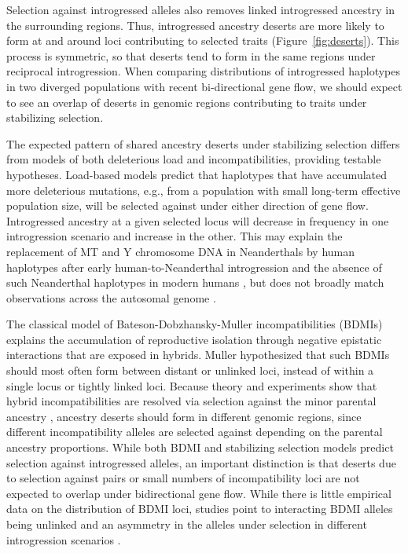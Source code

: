\documentclass[10pt,letterpaper]{article}
\begin{document}
Selection against introgressed alleles also removes linked introgressed
ancestry in the surrounding regions. Thus, introgressed ancestry deserts are
more likely to form at and around loci contributing to selected traits
(Figure~\ref{fig:deserts}). This process is symmetric, so that deserts tend to
form in the same regions under reciprocal introgression. When comparing
distributions of introgressed haplotypes in two diverged populations with
recent bi-directional gene flow, we should expect to see an overlap of deserts
in genomic regions contributing to traits under stabilizing selection.

The expected pattern of shared ancestry deserts under stabilizing selection
differs from models of both deleterious load and incompatibilities, providing
testable hypotheses. Load-based models predict that haplotypes that have
accumulated more deleterious mutations, e.g., from a population with small
long-term effective population size, will be selected against under either
direction of gene flow. Introgressed ancestry at a given selected locus will
decrease in frequency in one introgression scenario and increase in the other.
This may explain the replacement of MT and Y chromosome DNA in Neanderthals by
human haplotypes after early human-to-Neanderthal introgression and the absence
of such Neanderthal haplotypes in modern humans \cite{posth2017deeply,
petr2020evolutionary}, but does not broadly match observations across the
autosomal genome \cite{harris2023diverse}.

The classical model of Bateson-Dobzhansky-Muller incompatibilities (BDMIs)
\cite{bateson1909heredity, dobzhansky1936studies, muller1942isolating}
explains the accumulation of reproductive isolation through negative epistatic
interactions that are exposed in hybrids. Muller \cite{muller1942isolating}
hypothesized that such BDMIs should most often form between distant or unlinked
loci, instead of within a single locus or tightly linked loci. Because theory
and experiments show that hybrid incompatibilities are resolved via selection
against the minor parental ancestry \cite{matute2020rapid, moran2021genomic},
ancestry deserts should form in different genomic regions, since different
incompatibility alleles are selected against depending on the parental ancestry
proportions. While both BDMI and stabilizing selection models predict selection
against introgressed alleles, an important distinction is that deserts due to
selection against pairs or small numbers of incompatibility loci are not
expected to overlap under bidirectional gene flow. While there is little
empirical data on the distribution of BDMI loci, studies point to interacting
BDMI alleles being unlinked \cite{presgraves2003fine, li2022imbalanced} and an
asymmetry in the alleles under selection in different introgression scenarios
\cite{maheshwari2011genetics, moran2021genomic}.
\end{document}
